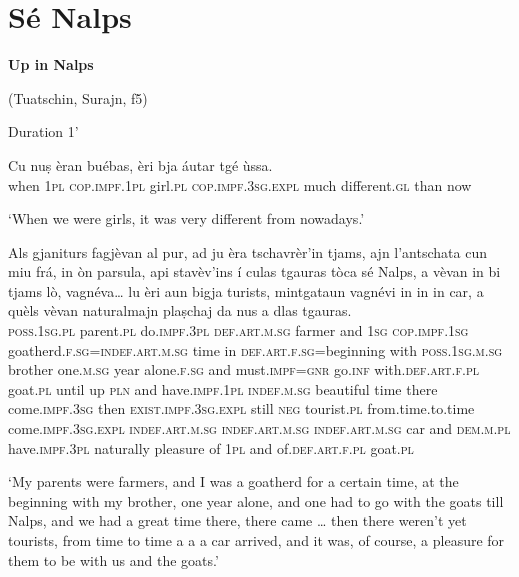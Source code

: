 \section{Sé Nalps}


\textbf{Up in Nalps}

\noindent
(Tuatschin, Surajn, f5)

\noindent
Duration 1'
\bigskip

\begin{linenumbers}
\gll    Cu nuṣ èran buébas, èri bja áutar tgé ùssa. \\
 when \textsc{1pl} \textsc{cop.impf.1pl} girl.\textsc{pl} \textsc{cop.impf.3sg.expl} much different.\textsc{gl} than now \\
\end{linenumbers}
\medskip
\glt `When we were girls, it was very different from nowadays.'
\medskip

\begin{linenumbers}
\gll    Als gjaniturs fagjèvan al pur, ad ju èra tschavrèr’in tjams, ajn l’antschata cun miu frá, in òn parsula, api stavèv’ins í culas tgauras tòca sé Nalps, a vèvan in bi tjams lò, vagnéva… lu èri aun bigja turists, mintgataun vagnévi in in in car, a quèls vèvan naturalmajn plaṣchaj da nus a dlas tgauras. \\
 \textsc{poss.1sg.pl} parent.\textsc{pl} do.\textsc{impf.3pl} \textsc{def.art.m.sg} farmer and   \textsc{1sg} \textsc{cop.impf.1sg} goatherd.\textsc{f.sg}=\textsc{indef.art.m.sg} time in   \textsc{def.art.f.sg}=beginning with \textsc{poss.1sg.m.sg} brother one.\textsc{m.sg} year alone.\textsc{f.sg}  and  must.\textsc{impf=gnr} go.\textsc{inf} with.\textsc{def.art.f.pl} goat.\textsc{pl} until up  \textsc{pln} and have.\textsc{impf.1pl} \textsc{indef.m.sg} beautiful time there come.\textsc{impf.3sg} then   \textsc{exist.impf.3sg.expl} still \textsc{neg} tourist.\textsc{pl} from.time.to.time come.\textsc{impf.3sg.expl}   \textsc{indef.art.m.sg} \textsc{indef.art.m.sg} \textsc{indef.art.m.sg} car and \textsc{dem.m.pl}  have.\textsc{impf.3pl} naturally  pleasure of \textsc{1pl} and of.\textsc{def.art.f.pl} goat.\textsc{pl} \\
\end{linenumbers}
\medskip
\glt `My parents were farmers, and I was a goatherd for a certain time, at the beginning with my brother, one year alone, and one had to go with the goats till Nalps, and we had a great time there, there came … then there weren’t yet tourists, from time to time a a a car arrived, and it was, of course, a pleasure for them to be with us and the goats.'
\medskip

